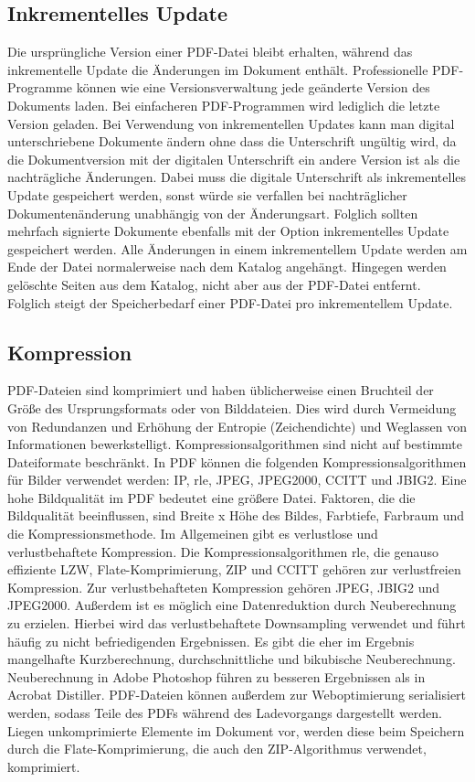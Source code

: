 \subsection{Inkrementelles Update}
Die ursprüngliche Version einer PDF-Datei bleibt erhalten, während das inkrementelle Update die Änderungen im Dokument enthält. Professionelle PDF-Programme können wie eine Versionsverwaltung jede geänderte Version des Dokuments laden. Bei einfacheren PDF-Programmen wird lediglich die letzte Version geladen. Bei Verwendung von inkrementellen Updates kann man digital unterschriebene Dokumente ändern ohne dass die Unterschrift ungültig wird, da die Dokumentversion mit der digitalen Unterschrift ein andere Version ist als die nachträgliche Änderungen. Dabei muss die digitale Unterschrift als inkrementelles Update gespeichert werden, sonst würde sie verfallen bei nachträglicher Dokumentenänderung unabhängig von der Änderungsart. Folglich sollten mehrfach signierte Dokumente ebenfalls mit der Option inkrementelles Update gespeichert werden. \cite{softx} Alle Änderungen in einem inkrementellem Update werden am Ende der Datei normalerweise nach dem Katalog angehängt. Hingegen werden gelöschte Seiten aus dem Katalog, nicht aber aus der PDF-Datei entfernt. Folglich steigt der Speicherbedarf einer PDF-Datei pro inkrementellem Update. \cite{schneeberger} 

\subsection{Kompression}
PDF-Dateien sind komprimiert und haben üblicherweise einen Bruchteil der Größe des Ursprungsformats oder von Bilddateien. Dies wird durch Vermeidung von Redundanzen und Erhöhung der Entropie (Zeichendichte) und Weglassen von Informationen bewerkstelligt. Kompressionsalgorithmen sind nicht auf bestimmte Dateiformate beschränkt. \cite{schneeberger} In PDF können die folgenden Kompressionsalgorithmen für Bilder verwendet werden: IP, \gls{rle}, JPEG, JPEG2000, CCITT und JBIG2. Eine hohe Bildqualität im PDF bedeutet eine größere Datei. Faktoren, die die Bildqualität beeinflussen, sind Breite x Höhe des Bildes, Farbtiefe, Farbraum und die Kompressionsmethode. \cite{softx} Im Allgemeinen gibt es verlustlose und verlustbehaftete Kompression. Die Kompressionsalgorithmen \gls{rle}, die genauso effiziente LZW, Flate-Komprimierung, ZIP und CCITT gehören zur verlustfreien Kompression. Zur verlustbehafteten Kompression gehören JPEG, JBIG2 und JPEG2000. Außerdem ist es möglich eine Datenreduktion durch Neuberechnung zu erzielen. Hierbei wird das verlustbehaftete Downsampling verwendet und führt häufig zu nicht befriedigenden Ergebnissen. Es gibt die eher im Ergebnis mangelhafte Kurzberechnung, durchschnittliche und bikubische Neuberechnung. Neuberechnung in Adobe Photoshop führen zu besseren Ergebnissen als in Acrobat Distiller. \cite{schneeberger}
PDF-Dateien können außerdem zur Weboptimierung serialisiert werden, sodass Teile des PDFs während des Ladevorgangs dargestellt werden. Liegen unkomprimierte Elemente im Dokument vor, werden diese beim Speichern durch die Flate-Komprimierung, die auch den ZIP-Algorithmus verwendet, komprimiert.

